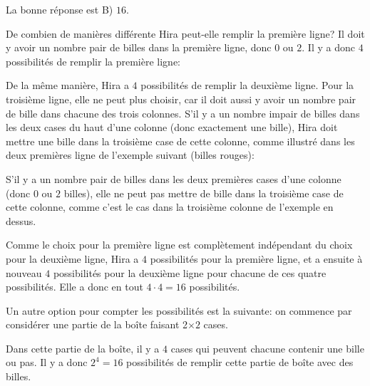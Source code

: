 \documentclass[a4paper,11pt]{report}
\newcommand{\taskGraphicsFolder}{..}
\begin{document}
La bonne réponse est B) $16$.

De combien de manières différente Hira peut-elle remplir la première ligne? Il doit y avoir un nombre pair de billes dans la première ligne, donc $0$ ou $2$. Il y a donc $4$ possibilités de remplir la première ligne:

{\centering%
\raisebox{-0.5ex}{}
\raisebox{-0.5ex}{}

\raisebox{-0.5ex}{}
\raisebox{-0.5ex}{}\par}

De la même manière, Hira a $4$ possibilités de remplir la deuxième ligne. Pour la troisième ligne, elle ne peut plus choisir, car il doit aussi y avoir un nombre pair de bille dans chacune des trois colonnes. S’il y a un nombre impair de billes dans les deux cases du haut d’une colonne (donc exactement une bille), Hira doit mettre une bille dans la troisième case de cette colonne, comme illustré dans les deux premières ligne de l’exemple suivant (billes rouges):

{\centering%
\par}

S’il y a un nombre pair de billes dans les deux premières cases d’une colonne (donc $0$ ou $2$ billes), elle ne peut pas mettre de bille dans la troisième case de cette colonne, comme c’est le cas dans la troisième colonne de l’exemple en dessus.

Comme le choix pour la première ligne est complètement indépendant du choix pour la deuxième ligne, Hira a $4$ possibilités pour la première ligne, et a ensuite à nouveau $4$ possibilités pour la deuxième ligne pour chacune de ces quatre possibilités. Elle a donc en tout  ${4 \cdot 4 = 16}$ possibilités.

Un autre option pour compter les possibilités est la suivante: on commence par considérer une partie de la boîte faisant 2\ensuremath{\times}$2$ cases.

{\centering%
\par}

Dans cette partie de la boîte, il y a $4$ cases qui peuvent chacune contenir une bille ou pas. Il y a donc ${2^4 = 16}$ possibilités de remplir cette partie de boîte avec des billes.
\end{document}
